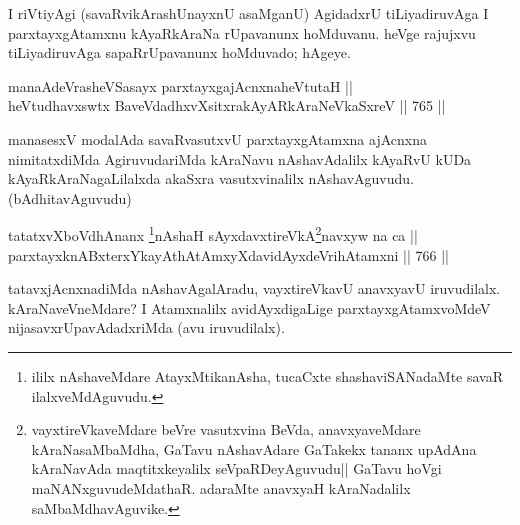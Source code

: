 \begin{artha} 
I riVtiyAgi (savaRvikArashUnayxnU asaMganU) AgidadxrU tiLiyadiruvAga I 
parxtayxgAtamxnu kAyaRkAraNa rUpavanunx hoMduvanu. heVge rajujxvu 
tiLiyadiruvAga sapaRrUpavanunx hoMduvado; hAgeye.  
\end{artha}
	

\begin{shl}
manaAdeVrasheVSasayx parxtayxgajAcnxnaheVtutaH || \\
heVtudhavxswtx BaveVdadhxvXsitxrakAyARkAraNeV\s kaSxreV \hfill || 765 ||  
\end{shl}

\begin{artha} 
manasesxV modalAda savaRvasutxvU parxtayxgAtamxna ajAcnxna nimitatxdiMda AgiruvudariMda kAraNavu nAshavAdalilx kAyaRvU kUDa kAyaRkAraNagaLilalxda akaSxra vasutxvinalilx nAshavAguvudu. (bAdhitavAguvudu)
\end{artha}


\begin{shl}
tatatxvXboVdhAnanx \footnote{ililx nAshaveMdare AtayxMtikanAsha, tucaCxte shashaviSANadaMte savaR ilalxveMdAguvudu.}nAshaH sAyxdavxtireVkA\footnote{vayxtireVkaveMdare beVre vasutxvina BeVda, anavxyaveMdare kAraNasaMbaMdha, GaTavu nAshavAdare GaTakekx tananx upAdAna kAraNavAda maqtitxkeyalilx seVpaRDeyAguvudu|| GaTavu hoVgi maNANxguvudeMdathaR. adaraMte anavxyaH kAraNadalilx saMbaMdhavAguvike.}navxyw na ca || \\
parxtayxknABxterxYkayAthAtAmxyXdavidAyxdeVrihA\s \s tamxni \hfill || 766 ||  
\end{shl}

\begin{artha} 
tatavxjAcnxnadiMda nAshavAgalAradu, vayxtireVkavU anavxyavU iruvudilalx. kAraNaveVneMdare? I Atamxnalilx avidAyxdigaLige parxtayxgAtamxvoMdeV nijasavxrUpavAdadxriMda (avu iruvudilalx).
\end{artha}


